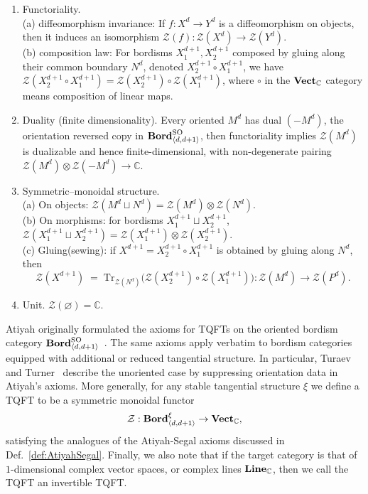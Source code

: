 \documentclass[aps,prx,reprint,superscriptaddress,twocolumn,amsmath,amssymb,amsfonts, nofootinbib]{revtex4-2}
\newcommand{\SO}{\text{SO}}
\newcommand{\bordd}{{\bf Bord}_{\langle d, d+1\rangle}}
\newcommand{\vect}{{\bf Vect}_{\mathbb{C}}}
\newcommand{\Line}{{\bf Line}_{\mathbb{C}}}
\theoremstyle{apsstyle}
\begin{document}
\begin{enumerate}[label=(A\arabic*)]
  \item Functoriality.\\
        (a) diffeomorphism invariance: If $f: X^{d}\to Y^{d}$ is a diffeomorphism on objects, then it induces an isomorphism $\mathcal{Z}(f): \mathcal{Z}(X^{d})\to \mathcal{Z}(Y^{d})$.\\
        (b) composition law: For bordisms $X_{1}^{d+1},X_{2}^{d+1}$ composed by gluing along their common boundary $N^{d}$, denoted $X_2^{d+1} \circ X_1^{d+1}$, we have $\mathcal Z(X_2^{d+1} \circ X_1^{d+1})=\mathcal Z(X_2^{d+1})\circ \mathcal Z(X_1^{d+1})$, where $\circ$ in the $\vect$ category means composition of linear maps.
  \item Duality (finite dimensionality).
        Every oriented $M^{d}$ has dual $(-M^d)$, the orientation reversed copy in $\bordd^{\SO}$, then functoriality implies $\mathcal Z(M^{d})$ is dualizable and hence finite-dimensional, with non-degenerate pairing
        $\mathcal Z(M^{d})\otimes \mathcal Z(-M^{d})\to\mathbb{C}$.
  \item Symmetric–monoidal structure.\\
        (a) On objects: $\mathcal Z(M^{d}\sqcup N^{d})=\mathcal Z(M^{d})\otimes \mathcal Z(N^{d})$.\\
        (b) On morphisms: for bordisms $X_1^{d+1}\sqcup X_2^{d+1}$, $\mathcal Z(X_1^{d+1}\sqcup X_2^{d+1})=\mathcal Z(X_1^{d+1})\otimes \mathcal Z(X_2^{d+1})$.\\
        (c) Gluing(sewing): if $X^{d+1}=X_2^{d+1}\circ X_1^{d+1}$ is obtained by gluing along
$N^{d}$, then
\[
\mathcal Z(X^{d+1}) \;=\;
\mathrm{Tr}_{\mathcal Z(N^{d})}
\bigl(\mathcal Z(X_2^{d+1})\circ \mathcal Z(X_1^{d+1})\bigr)
:\mathcal Z(M^{d})\to \mathcal Z(P^{d}).
\]
  \item Unit. $\mathcal Z(\varnothing)=\mathbb{C}$.
\end{enumerate}

Atiyah originally formulated the axioms for TQFTs on the oriented bordism category $\bordd^\SO$~\cite{Atiyah1988}. The same axioms apply verbatim to bordism categories equipped with additional or reduced tangential structure. In particular, Turaev and Turner~\cite{Turaev2005} describe the unoriented case by suppressing orientation data in Atiyah’s axioms. More generally, for any stable tangential structure $\xi$ we define a TQFT to be a symmetric monoidal functor
\begin{equation*}
    \mathcal{Z}: \bordd^{\xi} \to \vect,
\end{equation*}
satisfying the analogues of the Atiyah-Segal axioms discussed in Def.~\ref{def:AtiyahSegal}. Finally, we also note that if the target category is that of $1$-dimensional complex vector spaces, or complex lines $\Line$, then we call the TQFT an invertible TQFT.
\end{document}
